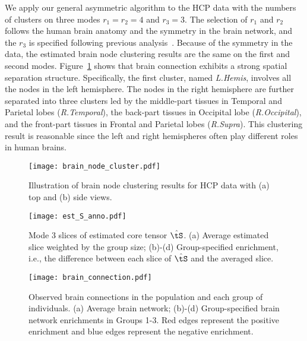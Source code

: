 \documentclass[lettersize,onecolumn,journal]{IEEEtran}
\theoremstyle{definition}
\theoremstyle{definition}
\begin{document}
We apply our general asymmetric algorithm to the HCP data with the numbers of clusters on three modes $r_1 = r_2 = 4$ and $r_3 = 3$. The selection of $r_1$ and $r_2$ follows the human brain anatomy and the symmetry in the brain network, and the $r_3$ is specified following previous analysis~\citep{hu2021generalized}. Because of the symmetry in the data, the estimated brain node clustering results are the same on the first and second modes. Figure~\ref{fig:cluster_brain} shows that brain connection exhibits a strong spatial separation structure. Specifically, the first cluster, named \emph{L.Hemis}, involves all the nodes in the left hemisphere. The nodes in the right hemisphere are further separated into three clusters led by the middle-part tissues in Temporal and Parietal lobes (\emph{R.Temporal}), the back-part tissues in Occipital lobe (\emph{R.Occipital}), and the front-part tissues in Frontal and Parietal lobes (\emph{R.Supra}). This clustering result is reasonable since the left and right hemispheres often play different roles in human brains. 


\begin{figure}[htb]
    \centering
    \texttt{[image: brain\_node\_cluster.pdf]}
    \caption{Illustration of brain node clustering results for HCP data with (a) top and (b) side views. }
    \label{fig:cluster_brain}
\end{figure}

\begin{figure*}[htb]
    \centering
    \texttt{[image: est\_S\_anno.pdf]}
    \caption{Mode 3 slices of estimated core tensor $\hat \tS$. (a) Average estimated slice weighted by the group size; (b)-(d) Group-specified enrichment, i.e., the difference between each slice of $\hat \tS$ and the averaged slice. }
    \label{fig:ests}
\end{figure*}

\begin{figure*}[htb]
    \centering
    \texttt{[image: brain\_connection.pdf]}
    \caption{Observed brain connections in the population and each group of individuals. (a) Average brain network; (b)-(d) Group-specified brain network enrichments in Groups 1-3. Red edges represent the positive enrichment and blue edges represent the negative enrichment.}
    \label{fig:brain_conn}
\end{figure*}
\end{document}
